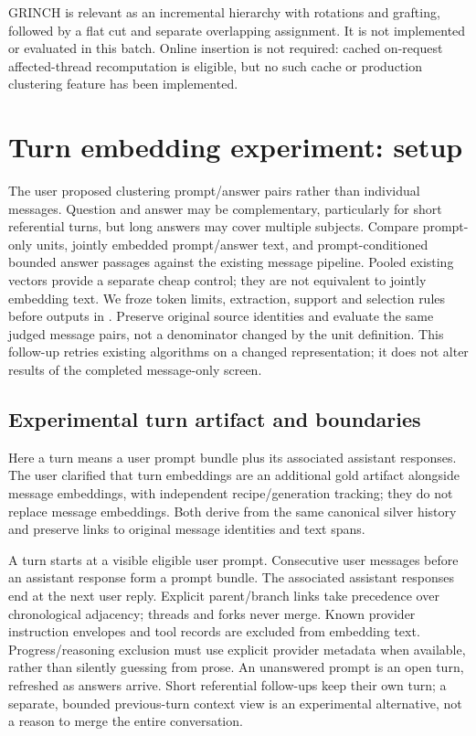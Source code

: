 \documentclass[11pt]{article}
\begin{document}
GRINCH \cite{grinch} is relevant as an incremental hierarchy with rotations and
grafting, followed by a flat cut and separate overlapping assignment. It is not
implemented or evaluated in this batch. Online insertion is not required:
cached on-request affected-thread recomputation is eligible, but no such cache
or production clustering feature has been implemented.

\section{Turn embedding experiment: setup}
The user proposed clustering prompt/answer pairs rather than individual messages.
Question and answer may be complementary, particularly for short referential
turns, but long answers may cover multiple subjects. Compare prompt-only units,
jointly embedded prompt/answer text, and prompt-conditioned bounded answer
passages against the existing message pipeline. Pooled existing vectors provide
a separate cheap control; they are not equivalent to jointly embedding text.
We froze token limits, extraction, support and selection rules before outputs in
. Preserve original source identities and
evaluate the same judged message pairs, not a denominator changed by the unit
definition. This follow-up retries existing algorithms on a changed representation;
it does not alter results of the completed message-only screen.

\subsection{Experimental turn artifact and boundaries}
Here a turn means a user prompt bundle plus its associated assistant responses.
The user clarified that turn embeddings are an additional gold artifact
alongside message embeddings, with independent recipe/generation tracking; they
do not replace message embeddings. Both derive from the same canonical silver
history and preserve links to original message identities and text spans.

A turn starts at a visible eligible user prompt. Consecutive user messages
before an assistant response form a prompt bundle. The associated assistant
responses end at the next user reply. Explicit parent/branch links
take precedence over chronological adjacency; threads and forks never merge.
Known provider instruction envelopes and tool records are excluded from embedding
text. Progress/reasoning exclusion must use explicit provider metadata when
available, rather than silently guessing from prose. An unanswered prompt is an
open turn, refreshed as answers arrive. Short referential follow-ups keep
their own turn; a separate, bounded previous-turn context view is
an experimental alternative, not a reason to merge the entire conversation.
\end{document}
